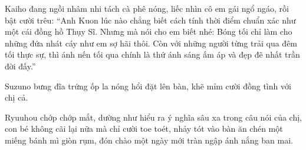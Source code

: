 \documentclass[../main.tex]{subfiles}
\begin{document}
Kaiho đang ngồi nhâm nhi tách cà phê nóng, liếc nhìn cô em gái ngổ ngáo, rồi bật cười trêu: ``Anh Kuon lúc nào chẳng biết cách tính thời điểm chuẩn xác như một cái đồng hồ Thụy Sĩ. Nhưng mà nói cho em biết nhé: Bóng tối chỉ làm cho những đứa nhát cáy như em sợ hãi thôi. Còn với những người từng trải qua đêm tối thực sự, thì ánh nến tối qua chính là thứ ánh sáng ấm áp và đẹp đẽ nhất trần đời đấy.''

Suzuno bưng đĩa trứng ốp la nóng hổi đặt lên bàn, khẽ mỉm cười đồng tình với chị cả.

Ryuuhou chớp chớp mắt, dường như hiểu ra ý nghĩa sâu xa trong câu nói của chị, con bé không cãi lại nữa mà chỉ cười toe toét, nhảy tót vào bàn ăn chén một miếng bánh mì giòn rụm, đón chào một ngày mới tràn ngập ánh nắng ban mai.
\end{document}
